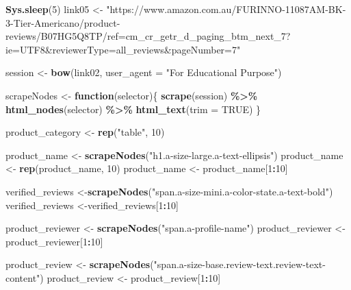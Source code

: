 \documentclass[
]{article}
\newenvironment{Shaded}{\begin{snugshade}}{\end{snugshade}}
\newcommand{\AttributeTok}[1]{\textcolor[rgb]{0.13,0.29,0.53}{#1}}
\newcommand{\ConstantTok}[1]{\textcolor[rgb]{0.56,0.35,0.01}{#1}}
\newcommand{\ControlFlowTok}[1]{\textcolor[rgb]{0.13,0.29,0.53}{\textbf{#1}}}
\newcommand{\DecValTok}[1]{\textcolor[rgb]{0.00,0.00,0.81}{#1}}
\newcommand{\FunctionTok}[1]{\textcolor[rgb]{0.13,0.29,0.53}{\textbf{#1}}}
\newcommand{\NormalTok}[1]{#1}
\newcommand{\OtherTok}[1]{\textcolor[rgb]{0.56,0.35,0.01}{#1}}
\newcommand{\SpecialCharTok}[1]{\textcolor[rgb]{0.81,0.36,0.00}{\textbf{#1}}}
\newcommand{\StringTok}[1]{\textcolor[rgb]{0.31,0.60,0.02}{#1}}
\begin{document}
\begin{Shaded}
\begin{Highlighting}[]
   \FunctionTok{Sys.sleep}\NormalTok{(}\DecValTok{5}\NormalTok{)}
\NormalTok{link05 }\OtherTok{\textless{}{-}} \StringTok{"https://www.amazon.com.au/FURINNO{-}11087AM{-}BK{-}3{-}Tier{-}Americano/product{-}reviews/B07HG5Q8TP/ref=cm\_cr\_getr\_d\_paging\_btm\_next\_7?ie=UTF8\&reviewerType=all\_reviews\&pageNumber=7"}


\NormalTok{  session }\OtherTok{\textless{}{-}} \FunctionTok{bow}\NormalTok{(link02,}
               \AttributeTok{user\_agent =} \StringTok{"For Educational Purpose"}\NormalTok{)}

\NormalTok{  scrapeNodes }\OtherTok{\textless{}{-}} \ControlFlowTok{function}\NormalTok{(selector)\{}
    \FunctionTok{scrape}\NormalTok{(session) }\SpecialCharTok{\%\textgreater{}\%}
      \FunctionTok{html\_nodes}\NormalTok{(selector) }\SpecialCharTok{\%\textgreater{}\%}
      \FunctionTok{html\_text}\NormalTok{(}\AttributeTok{trim =} \ConstantTok{TRUE}\NormalTok{)}
\NormalTok{  \}}

\NormalTok{  product\_category }\OtherTok{\textless{}{-}} \FunctionTok{rep}\NormalTok{(}\StringTok{"table"}\NormalTok{, }\DecValTok{10}\NormalTok{)}

\NormalTok{  product\_name }\OtherTok{\textless{}{-}} \FunctionTok{scrapeNodes}\NormalTok{(}\StringTok{"h1.a{-}size{-}large.a{-}text{-}ellipsis"}\NormalTok{)}
\NormalTok{  product\_name }\OtherTok{\textless{}{-}} \FunctionTok{rep}\NormalTok{(product\_name, }\DecValTok{10}\NormalTok{)}
\NormalTok{  product\_name }\OtherTok{\textless{}{-}}\NormalTok{ product\_name[}\DecValTok{1}\SpecialCharTok{:}\DecValTok{10}\NormalTok{]}
  
\NormalTok{  verified\_reviews }\OtherTok{\textless{}{-}}\FunctionTok{scrapeNodes}\NormalTok{(}\StringTok{"span.a{-}size{-}mini.a{-}color{-}state.a{-}text{-}bold"}\NormalTok{)}
\NormalTok{  verified\_reviews }\OtherTok{\textless{}{-}}\NormalTok{verified\_reviews[}\DecValTok{1}\SpecialCharTok{:}\DecValTok{10}\NormalTok{]}
  
\NormalTok{  product\_reviewer }\OtherTok{\textless{}{-}} \FunctionTok{scrapeNodes}\NormalTok{(}\StringTok{"span.a{-}profile{-}name"}\NormalTok{)}
\NormalTok{  product\_reviewer }\OtherTok{\textless{}{-}}\NormalTok{ product\_reviewer[}\DecValTok{1}\SpecialCharTok{:}\DecValTok{10}\NormalTok{]}
  
\NormalTok{  product\_review }\OtherTok{\textless{}{-}} \FunctionTok{scrapeNodes}\NormalTok{(}\StringTok{"span.a{-}size{-}base.review{-}text.review{-}text{-}content"}\NormalTok{)}
\NormalTok{  product\_review }\OtherTok{\textless{}{-}}\NormalTok{ product\_review[}\DecValTok{1}\SpecialCharTok{:}\DecValTok{10}\NormalTok{]}
  

\end{Highlighting}
\end{Shaded}
\end{document}
